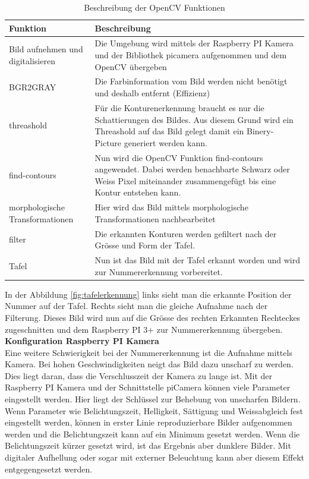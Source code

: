 \documentclass[../../main.tex]{subfiles}
\begin{document}
    \begin{table}[H]
        \begin{flushleft}
            \begin{tabular}{ | p{3cm} | p{10.5cm} |}
                \hline
                \textbf{Funktion}  & \textbf{Beschreibung} \\\hline
                Bild aufnehmen und digitalisieren & Die Umgebung wird mittels der Raspberry PI Kamera und der Bibliothek picamera aufgenommen und dem OpenCV übergeben \\\hline
                BGR2GRAY & Die Farbinformation vom Bild werden nicht benötigt und deshalb entfernt (Effizienz) \\ \hline
                threashold & Für die Konturenerkennung braucht es nur die Schattierungen des Bildes. Aus diesem Grund wird ein Threashold auf das Bild gelegt damit ein Binery- Picture generiert werden kann. \\ \hline
                find-contours & Nun wird die OpenCV Funktion find-contours angewendet. Dabei werden benachbarte Schwarz oder Weiss Pixel miteinander zusammengefügt bis eine Kontur entstehen kann. \\ \hline
                morphologische Transformationen & Hier wird das Bild mittels morphologische Transformationen nachbearbeitet \\ \hline
                filter & Die erkannten Konturen werden gefiltert nach der Grösse und Form der Tafel. \\ \hline
                Tafel & Nun ist das Bild mit der Tafel erkannt worden und wird zur Nummererkennung vorbereitet. \\ \hline
            \end{tabular}
        \end{flushleft}
        \caption{Beschreibung der OpenCV Funktionen}
        \label{tab:OpenCV_Funktionen_Tafelerkennung}
     \end{table}

     In der Abbildung \ref{fig:tafelerkennung} links sieht man die erkannte Position der Nummer auf der Tafel. Rechts sieht man die gleiche Aufnahme nach der Filterung. Dieses Bild wird nun auf die Grösse des rechten Erkannten Rechteckes zugeschnitten und dem Raspberry PI 3+ zur Nummererkennung übergeben.\\

     \textbf{Konfiguration Raspberry PI Kamera}\\
     Eine weitere Schwierigkeit bei der Nummererkennung ist die Aufnahme mittels Kamera. Bei hohen Geschwindigkeiten neigt das Bild dazu unscharf zu werden. Dies liegt daran, dass die Verschlusszeit der Kamera zu lange ist. Mit der Raspberry PI Kamera und der Schnittstelle piCamera können viele Parameter eingestellt werden. Hier liegt der Schlüssel zur Behebung von unscharfen Bildern. Wenn Parameter wie Belichtungszeit, Helligkeit, Sättigung und Weissabgleich fest eingestellt werden, können in erster Linie reproduzierbare Bilder aufgenommen werden und die Belichtungszeit kann auf ein Minimum gesetzt werden. Wenn die Belichtungszeit kürzer gesetzt wird, ist das Ergebnis aber dunklere Bilder. Mit digitaler Aufhellung oder sogar mit externer Beleuchtung kann aber diesem Effekt entgegengesetzt werden.
\end{document}
